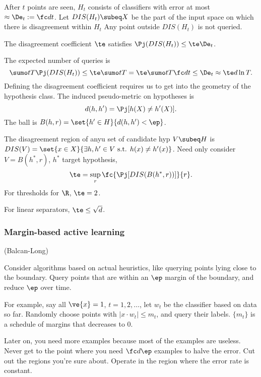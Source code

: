 After $t$ points are seen, $H_t$ consists of classifiers with error at most $\approx \De_t:=\fc dt$. Let $DIS(H_t)\subeq  X$ be the part of the input space on which there is disagreement within $H_t$ Any point outside $DIS(H_t)$ is not queried.

The disagreement coefficient $\te$ satisfies $\Pj(DIS(H_t))\le \te \De_t$.

The expected number of queries is
$$
\sumo tT \Pj (DIS(H_t))\le \te\sumo tT = \te \sumo tT\fc dt\le \De_t \approx \te d \ln T.
$$
Defining the disagreement coefficient requires us to get into the geometry of the hypothesis class.
The induced pseudo-metric on hypotheses is 
$$
d(h,h') = \Pj[h(X)\ne h'(X)].
$$
The ball is $B(h,r)=\set{h'\in H}{d(h,h')<\ep}$.


The disagreement region of anyu set of candidate hyp $V\subeq H$ is $DIS(V) = \set{x\in X}{\exists h,h'\in V \text{ s.t. }h(x)\ne h'(x)}$. Need only consider $V=B(h^*,r)$, $h^*$ target hypothesis,
$$
\te = \sup_r\fc{\Pj[DIS(B(h^*,r))]}{r}.
$$
For thresholds for $\R$, $\te =2$.

For linear separators, $\te\le \sqrt d$.
\subsubsection{Margin-based active learning}

(Balcan-Long)

Consider algorithms based on actual heuristics, like  querying points lying close to the boundary. Query points that are within an $\ep$ margin of the boundary, and reduce $\ep$ over time.

\begin{alg}
For example, say all $\ve{x}=1$, $t=1,2,\ldots$, let $w_t$ be the classifier based on data so far. Randomly choose points with $|x\cdot w_t|\le m_t$, and query their labels. $\{m_t\}$ is a schedule of margins that decreases to 0.
\end{alg}

Later on, you need more examples because most of the examples are useless. Never get to the point where you need $\fc d{\ep}$ examples to halve the error. Cut out the regions you're sure about. Operate in the region where the error rate is constant.



